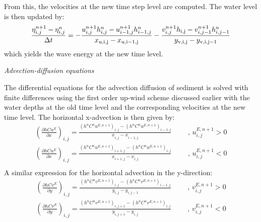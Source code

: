 From this, the velocities at the new time step level are computed. The water level is then updated by:
\begin{equation} \label{21)} 
\frac{\eta _{i,j}^{n+1} -\eta _{i,j}^{n} }{\Delta t} =-\frac{u_{i,j}^{n+1} h_{i,j}^{n} -u_{i-1,j}^{n+1} h_{i-1,j}^{n} }{x_{{\rm u,i,j}} -x_{{\rm u,i-1,j}} } -\frac{v_{i,j}^{n+1} h_{{\rm i,j}} -v_{i,j-1}^{n+1} h_{i,j-1}^{n} }{y_{{\rm v,i,j}} -y_{{\rm v,i,j-1}} }  
\end{equation} 
\eject which yields the wave energy at the new time level.


{\it  Advection-diffusion equations}

The differential equations for the advection diffusion of sediment is solved with finite differences using the first order up-wind scheme discussed earlier with the water depths at the old time level and the corresponding velocities at the new time level. The horizontal x-advection is then given by:
\begin{equation} \label{2.22)} 
\begin{array}{l} {\left(\frac{\partial hCu^{E} }{\partial x} \right)_{i,j} =\frac{\left(h^{n} C^{n} u^{E,n+1} \right)_{i,j} -\left(h^{n} C^{n} u^{E,n+1} \right)_{i-1,j} }{x_{i,j}^{} -x_{i-1,j}^{} } \, \, \, \, \, \, \, \, \, \, \, \, \, \, ,\, u_{i,j}^{E,n+1} >0} \\ {\left(\frac{\partial hCu^{E} }{\partial x} \right)_{i,j} =\frac{\left(h^{n} C^{n} u^{E,n+1} \right)_{i+1,j} -\left(h^{n} C^{n} u^{E,n+1} \right)_{i,j} }{x_{i+1,j}^{} -x_{i,j}^{} } \, \, \, \, \, \, \, \, \, \, \, \, \, \, ,\, u_{i,j}^{E,n+1} <0} \\ {} \end{array} 
\end{equation} 
A similar expression for the horizontal advection in the y-direction:
\begin{equation} \label{2.23)} 
\begin{array}{l} {\left(\frac{\partial hCv^{E} }{\partial y} \right)_{i,j} =\frac{\left(h^{n} C^{n} v^{E,n+1} \right)_{i,j} -\left(h^{n} C^{n} v^{E,n+1} \right)_{i-1,j} }{y_{i,j}^{} -y_{i,j-1}^{} } \, \, \, \, \, \, \, \, \, \, \, \, \, \, ,\, v_{i,j}^{E,n+1} >0} \\ {\left(\frac{\partial hCv^{E} }{\partial y} \right)_{i,j} =\frac{\left(h^{n} C^{n} v^{E,n+1} \right)_{i,j+1} -\left(h^{n} C^{n} v^{E,n+1} \right)_{i,j} }{y_{i,j+1}^{} -y_{i,j}^{} } \, \, \, \, \, \, \, \, \, \, \, \, \, \, ,\, v_{i,j}^{E,n+1} <0} \\ {} \end{array} 
\end{equation} 
